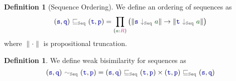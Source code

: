 \documentclass[twoside,11pt,openright]{report}
\theoremstyle{plain} %
\theoremstyle{definition}
\newtheorem{defn}[thm]{Definition}%
\theoremstyle{remark}
\newcommand*{\term}[1]{\textcolor{green!30!black}{#1}} %
\newcommand*{\type}[1]{\textcolor{magenta!90!black}{#1}}
\newcommand*{\relation}[1]{\textcolor{gray!75!black}{\ensuremath{\mathtt{#1}}}}
\newcommand*{\function}[1]{\textcolor{blue!60!black}{\ensuremath{\mathtt{#1}}}}
\begin{document}
\begin{defn}[Sequence Ordering] We define an ordering of sequences as
  \begin{equation}
    (\function{s},\function{q})~\relation{\sqsubseteq_{Seq}}~(\function{t},\function{p}) = \prod_{(\term{a} : \type{R})} \left(\|\function{s}~\relation{\downarrow_{Seq}}~\term{a}\| \rightarrow \| \function{t}~\relation{\downarrow_{Seq}}~\term{a}\|\right)
  \end{equation}
  where \(\| \cdot \|\) is propositional truncation.
\end{defn}
\begin{defn} We define weak bisimilarity for sequences as
  \begin{equation}
    (\function{s},\function{q})~\relation{\sim_{Seq}}~(\function{t},\function{p}) = (\function{s},\function{q})~\relation{\sqsubseteq_{Seq}}~(\function{t},\function{p}) \times (\function{t},\function{p})~\relation{\sqsubseteq_{Seq}}~(\function{s},\function{q})
  \end{equation}
\end{defn}
\end{document}
